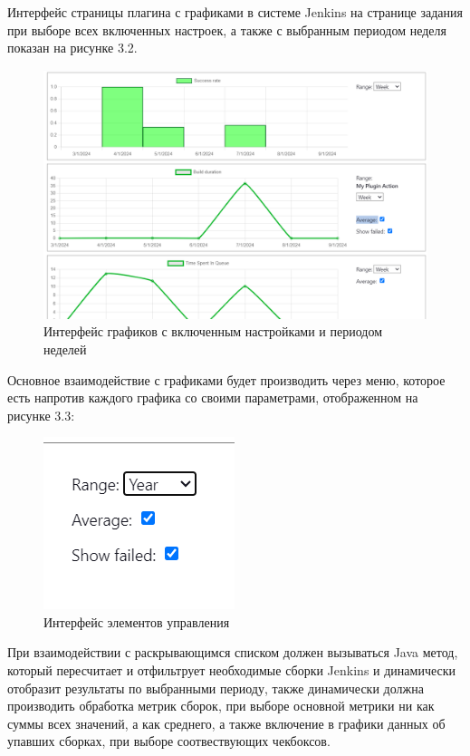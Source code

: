 Интерфейс страницы плагина с графиками в системе Jenkins на странице задания при выборе всех включенных настроек, а также с выбранным периодом неделя показан на рисунке 3.2.

\begin{figure}[ht!] 
	\center
	\includegraphics [scale=0.47] {my_folder/images//ui4}
	\caption{Интерфейс графиков с включенным настройками и периодом неделей} 
	\label{fig:ArchitectureJenkins}  
\end{figure}

Основное взаимодействие с графиками будет производить через меню, которое есть напротив каждого графика со своими параметрами, отображенном на рисунке 3.3:

\begin{figure}[ht!] 
	\center
	\includegraphics [scale=0.47] {my_folder/images//ui2}
	\caption{Интерфейс элементов управления} 
	\label{fig:ArchitectureJenkins}  
\end{figure}

При взаимодействии с раскрывающимся списком должен вызываться Java метод, который пересчитает и отфильтрует необходимые сборки Jenkins и динамически отобразит результаты по выбранными периоду, также динамически должна производить обработка метрик сборок, при выборе основной метрики ни как суммы всех значений, а как среднего, а также включение в графики данных об упавших сборках, при выборе соотвествующих чекбоксов.

